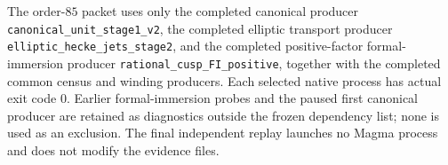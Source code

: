 \begin{remark}
The order-$85$ packet uses only the completed canonical producer \texttt{canonical\_unit\_stage1\_v2}, the completed elliptic transport producer \texttt{elliptic\_hecke\_jets\_stage2}, and the completed positive-factor formal-immersion producer \texttt{rational\_cusp\_FI\_positive}, together with the completed common census and winding producers. Each selected native process has actual exit code $0$. Earlier formal-immersion probes and the paused first canonical producer are retained as diagnostics outside the frozen dependency list; none is used as an exclusion. The final independent replay launches no Magma process and does not modify the evidence files.
\end{remark}
